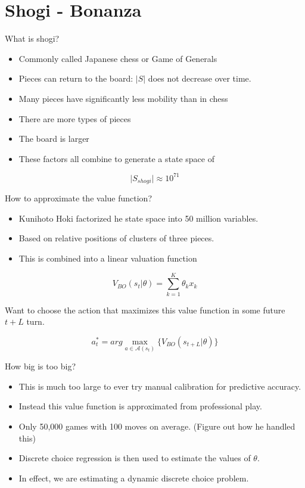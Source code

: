 \documentclass[presentation]{beamer}
\begin{document}
\section{Shogi - Bonanza}
\label{sec:org46b6876}

\begin{frame}[label={sec:orgf6ffe01}]{What is shogi?}
\begin{itemize}
\item Commonly called Japanese chess or Game of Generals
\item Pieces can return to the board: \(\vert S \vert\) does not decrease over time.
\item Many pieces have significantly less mobility than in chess
\item There are more types of pieces
\item The board is larger
\item These factors all combine to generate a state space of
\end{itemize}
\begin{equation*}
  \vert S_{shogi} \vert \approx 10^{71}
\end{equation*}
\end{frame}

\begin{frame}[label={sec:orgd3054f8}]{How to approximate the value function?}
\begin{itemize}
\item Kunihoto Hoki factorized he state space into 50 million variables.
\item Based on relative positions of clusters of three pieces.
\item This is combined into a linear valuation function
\end{itemize}
\begin{equation*}
  V_{BO}(s_t \vert \theta) = \sum_{k=1}^K \theta_k x_k
\end{equation*}

Want to choose the action that maximizes this value function in some
future $t+L$ turn.

\begin{equation*}
  a_t^{*} = arg\max_{a \in \mathcal{A}(s_t)} \{ V_{BO}(s_{t+L} \vert \theta) \}
\end{equation*}
\end{frame}

\begin{frame}[label={sec:org4304f26}]{How big is too big?}
\begin{itemize}
\item This is much too large to ever try manual calibration for predictive
accuracy.
\item Instead this value function is approximated from professional play.
\item Only 50,000 games with 100 moves on average.  (Figure out how he
handled this)
\item Discrete choice regression is then used to estimate the values of
\(\theta\).
\item In effect, we are estimating a dynamic discrete choice problem.
\end{itemize}
\end{frame}
\end{document}
